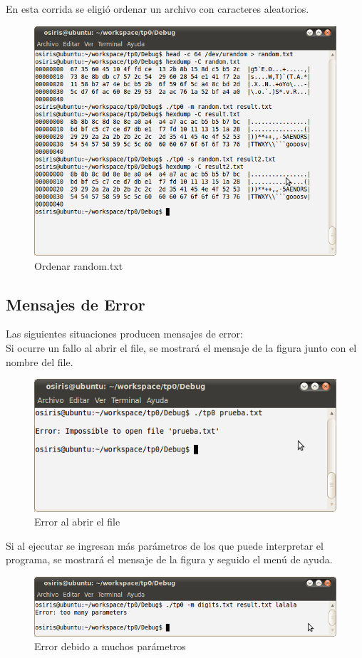 \documentclass[a4paper,10pt]{article}
\begin{document}
En esta corrida se eligió ordenar un archivo con caracteres aleatorios.\\
\begin{figure}[!htp]
	\centering
	\includegraphics[width=10.5 cm]{tp0_corrida_exitosa_2.png}
	\caption{Ordenar random.txt}
	\label{Figura5}
\end{figure}



\newpage
\subsection{Mensajes de Error}
Las siguientes situaciones producen mensajes de error:\\

Si ocurre un fallo al abrir el file, se mostrará el mensaje de la figura junto con el nombre del file.\\

\begin{figure}[!htp]
	\centering
	\includegraphics[width=8.5 cm]{tp0_error_openfile.png}
	\caption{Error al abrir el file}
	\label{Figura6}
\end{figure}

\newpage
Si al ejecutar se ingresan más parámetros de los que puede interpretar el programa, se mostrará el mensaje de la figura y seguido el menú de ayuda.\\
\begin{figure}[!htp]
	\centering
	\includegraphics[height=2.1 cm]{tp0_error_2manyparam.png}
	\caption{Error debido a muchos parámetros}
	\label{Figura7}
\end{figure}
\end{document}
